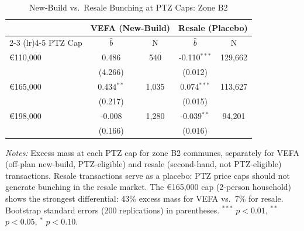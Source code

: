 \begin{table}[H]
\centering
\caption{New-Build vs.\ Resale Bunching at PTZ Caps: Zone B2}
\label{tab:placebo}
\begin{threeparttable}
\begin{tabular}{lcccc}
\toprule
 & \multicolumn{2}{c}{VEFA (New-Build)} & \multicolumn{2}{c}{Resale (Placebo)} \\
\cmidrule(lr){2-3} \cmidrule(lr){4-5}
PTZ Cap & $\hat{b}$ & N & $\hat{b}$ & N \\
\midrule
\euro110,000 & 0.486 & 540 & -0.110$^{***}$ & 129,662 \\
 & (4.266) & & (0.012) & \\
\euro165,000 & 0.434$^{**}$ & 1,035 & 0.074$^{***}$ & 113,627 \\
 & (0.217) & & (0.015) & \\
\euro198,000 & -0.008 & 1,280 & -0.039$^{**}$ & 94,201 \\
 & (0.166) & & (0.016) & \\
\bottomrule
\end{tabular}
\begin{tablenotes}[flushleft]
\small
\item \textit{Notes:} Excess mass at each PTZ cap for zone B2 communes, separately for VEFA (off-plan new-build, PTZ-eligible) and resale (second-hand, not PTZ-eligible) transactions. Resale transactions serve as a placebo: PTZ price caps should not generate bunching in the resale market. The \euro165,000 cap (2-person household) shows the strongest differential: 43\% excess mass for VEFA vs.\ 7\% for resale. Bootstrap standard errors (200 replications) in parentheses. $^{***}$ $p<0.01$, $^{**}$ $p<0.05$, $^{*}$ $p<0.10$.
\end{tablenotes}
\end{threeparttable}
\end{table}
